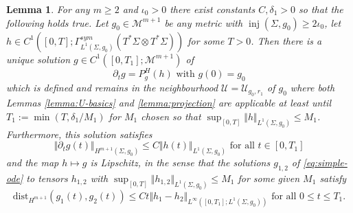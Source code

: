 \documentclass[10pt,reqno]{amsart}
\theoremstyle{plain}
\newtheorem{lemma}{Lemma}[section]
\theoremstyle{definition}
\numberwithin{equation}{section}
\newcommand{\de}{\delta}
\newcommand{\Si}{\Sigma}
\DeclareMathOperator{\inj}{inj}
\newcommand{\norm}[1]{\Vert#1\Vert}
\newcommand{\beq}{\begin{equation}}
\newcommand{\eeq}{\end{equation}}
\newcommand{\pt}{\partial_t}
\newcommand{\dist}{\text{dist}}
\newcommand{\MM}{\mathcal{M}} %
\newcommand{\UU}{{\mathcal U}}
\begin{document}
\begin{lemma}\label{lemma:simple-ode}
    For any $m\ge 2$ and $\iota_0>0$  there exist constants $C,\delta_1>0$ so that the following holds true. Let $g_0\in \MM^{m+1}$ be any metric with $\inj(\Si,g_0)\geq 2\iota_0$, let $h\in C^1([0,T]; \Gamma^{sym}_{L^1(\Si,g_0)}(T^*\Si\otimes T^*\Si))$ for some $T>0$. Then there is a unique solution $g \in C^{1}([0,T_1];\MM^{m+1})$ of 
    \beq\label{eq:simple-ode}
        \pt g=P_g^H(h) \text{ with } g(0)=g_0
    \eeq
    which is defined and remains in the neighbourhood $\UU=\UU_{g_0,r_1}$ of $g_0$ where both Lemmas \ref{lemma:U-basics} and \ref{lemma:projection} are applicable at least until $T_1:=\min(T, \de_1/M_1)$ for $M_1$ chosen so that $\sup_{[0,T]} \norm{h}_{L^1(\Si,g_0)}\leq M_1$. Furthermore, this solution satisfies 
    \beq\label{est:basic-ode-est}
        \norm{\pt g(t)}_{H^{m+1}(\Si,g_0)}\leq C \norm{h(t)}_{L^1(\Si,g_0)} \text{ for all } t\in [0,T_1]
    \eeq
    and the map $h\mapsto g$ is Lipschitz, in the sense that the solutions $g_{1,2}$ of \eqref{eq:simple-ode} to tensors $h_{1,2}$ with $\sup_{[0,T]} \norm{h_{1,2}}_{L^1(\Si,g_0)}\leq M_1$ for some given $M_1$ satisfy 
    \beq\label{est:lip-g-simple}
        \dist_{H^{m+1}}(g_1(t),g_2(t))\leq C t \norm{h_1-h_2}_{L^\infty([0,T_1];L^1(\Si,g_0))} \text{ for all } 0\leq t\leq T_1.
    \eeq
\end{lemma}
\end{document}
